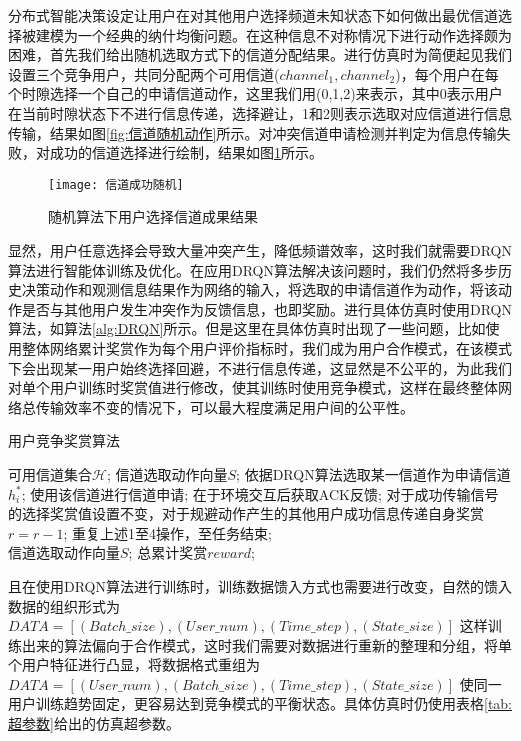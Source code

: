 分布式智能决策设定让用户在对其他用户选择频道未知状态下如何做出最优信道选择被建模为一个经典的纳什均衡问题。在这种信息不对称情况下进行动作选择颇为困难，首先我们给出随机选取方式下的信道分配结果。进行仿真时为简便起见我们设置三个竞争用户，共同分配两个可用信道($channel_{1},channel_{2}$)，每个用户在每个时隙选择一个自己的申请信道动作，这里我们用(0,1,2)来表示，其中0表示用户在当前时隙状态下不进行信息传递，选择避让，1和2则表示选取对应信道进行信息传输，结果如图\ref{fig:信道随机动作}所示。对冲突信道申请检测并判定为信息传输失败，对成功的信道选择进行绘制，结果如图\ref{fig:信道成功随机}所示。
\begin{figure}[htbp]
	\centering
	\texttt{[image: 信道成功随机]}
	\caption{随机算法下用户选择信道成果结果}
	\label{fig:信道成功随机}
\end{figure}
显然，用户任意选择会导致大量冲突产生，降低频谱效率，这时我们就需要DRQN算法进行智能体训练及优化。在应用DRQN算法解决该问题时，我们仍然将多步历史决策动作和观测信息结果作为网络的输入，将选取的申请信道作为动作，将该动作是否与其他用户发生冲突作为反馈信息，也即奖励。进行具体仿真时使用DRQN算法，如算法\ref{alg:DRQN}所示。但是这里在具体仿真时出现了一些问题，比如使用整体网络累计奖赏作为每个用户评价指标时，我们成为用户合作模式，在该模式下会出现某一用户始终选择回避，不进行信息传递，这显然是不公平的，为此我们对单个用户训练时奖赏值进行修改，使其训练时使用竞争模式，这样在最终整体网络总传输效率不变的情况下，可以最大程度满足用户间的公平性。
\begin{algorithm}[htb]  
	\caption{用户竞争奖赏算法}  
	\label{alg:headstate}  
	\begin{algorithmic}[1]  
		\Require  
		可用信道集合$\mathcal{H}$; 
		\Ensure  
		信道选取动作向量$S$;  
		\State 依据DRQN算法选取某一信道作为申请信道$h_{i}^{*}$;
		\State 使用该信道进行信道申请;				
		\State 在于环境交互后获取ACK反馈;  
		\State 对于成功传输信号的选择奖赏值设置不变，对于规避动作产生的其他用户成功信息传递自身奖赏$r=r-1$;
		\State 重复上述1至4操作，至任务结束; \\
		\Return 信道选取动作向量$S$; 总累计奖赏$reward$; 
	\end{algorithmic}  
\end{algorithm}  
且在使用DRQN算法进行训练时，训练数据馈入方式也需要进行改变，自然的馈入数据的组织形式为$DATA=\left[\left(Batch\_size \right),\left(User\_num \right),\left(Time\_step \right),\left(State\_size \right)\right]$ 这样训练出来的算法偏向于合作模式，这时我们需要对数据进行重新的整理和分组，将单个用户特征进行凸显，将数据格式重组为$DATA=\left[\left(User\_num \right),\left(Batch\_size \right),\left(Time\_step \right),\left(State\_size \right)\right]$ 使同一用户训练趋势固定，更容易达到竞争模式的平衡状态。具体仿真时仍使用表格\ref{tab:超参数}给出的仿真超参数。

